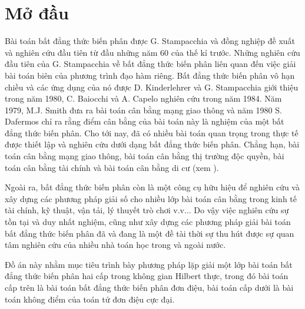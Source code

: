 \documentclass[14pt, oneside,A4paper]{book}
\theoremstyle{plain}
\begin{document}

\listoftables
{}

\chapter*{Mở đầu}


\fontsize{14pt}{16pt}\selectfont

Bài toán bất đẳng thức biến phân được G. Stampacchia và đồng nghiệp \cite{Stam} đề xuất và nghiên cứu đầu tiên  từ đầu những năm 60 của thế kỉ trước. Những nghiên cứu đầu tiên của G. Stampacchia về bất đẳng thức biến phân liên quan đến việc giải bài toán biên của phương trình đạo hàm riêng. Bất đẳng thức biến phân vô hạn chiều và các ứng dụng của nó được D. Kinderlehrer và G. Stampacchia giới thiệu trong \cite{Kin} năm 1980, C. Baiocchi và A. Capelo nghiên cứu trong \cite{Bai} năm 1984. Năm 1979, M.J. Smith \cite{Smith} đưa ra bài toán cân bằng mạng giao thông và năm 1980 S. Dafermos \cite{Daf} chỉ ra rằng điểm cân bằng của bài toán này là nghiệm của một bất đẳng thức biến phân. Cho tới nay, đã có nhiều bài toán quan trọng trong thực tế được thiết lập và nghiên cứu dưới dạng bất đẳng thức biến phân. Chẳng hạn, bài toán cân bằng mạng giao thông, bài toán cân bằng thị trường độc quyền, bài toán cân bằng tài chính và bài toán cân bằng di cư (xem \cite{Nag}). 
  
Ngoài ra, bất đẳng thức biến phân còn là một công cụ hữu hiệu để nghiên cứu và xây dựng các phương pháp giải số cho nhiều lớp bài toán cân bằng trong kinh tế tài chính, kỹ thuật, vận tải, lý thuyết trò chơi v.v$\dots$ Do vậy việc nghiên cứu sự tồn tại và duy nhất nghiệm, cũng như xây dựng các phương pháp giải bài toán bất đẳng thức biến phân đã và đang là một đề tài thời sự thu hút được sự quan tâm nghiên cứu của nhiều nhà toán học trong và ngoài nước.

Đồ án này nhằm mục tiêu trình bày phương pháp lặp giải một lớp bài toán bất đẳng thức biến phân hai cấp trong không gian Hilbert thực, trong đó bài toán cấp trên là bài toán bất đẳng thức biến phân đơn điệu, bài toán cấp dưới là bài toán không điểm của toán tử đơn điệu cực đại.
\end{document}
